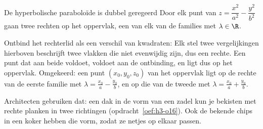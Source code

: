 \begin{theorie}
\begin{minipage}[t]{.7\linewidth}
\vspace{0pt}
\begin{stelling}{De hyperbolische paraboloïde is dubbel geregeerd}
Door elk punt van $z = \dfrac{x^2}{a^2} - \dfrac{y^2}{b^2}$ gaan twee rechten op het oppervlak, een van elk van de families
met $\lambda \in \R$.
\end{stelling}
\end{minipage}\hfill
\begin{minipage}[t]{.26\linewidth}
\vspace{0pt}
\centering
{}
\end{minipage}

\begin{bewijs}
Ontbind het rechterlid als een verschil van kwadraten:
Elk stel twee vergelijkingen hierboven beschrijft twee vlakken die niet evenwijdig zijn, dus een rechte. Een punt dat aan beide voldoet, voldoet aan de ontbinding, en ligt dus op het oppervlak. Omgekeerd: een punt $(x_0, y_0, z_0)$ van het oppervlak ligt op de rechte van de eerste familie met $\lambda = \tfrac{x_0}{a} - \tfrac{y_0}{b}$, en op die van de tweede met $\lambda = \tfrac{x_0}{a} + \tfrac{y_0}{b}$.
\end{bewijs}
\end{theorie}

Architecten gebruiken dat: een dak in de vorm van een zadel kun je bekisten met rechte planken in twee richtingen (opdracht~\ref{oef:h3-o16}). Ook de bekende chips in een koker hebben die vorm, zodat ze netjes op elkaar passen.



